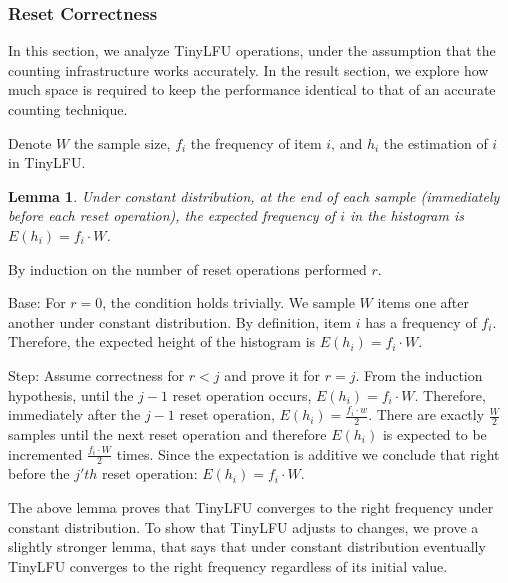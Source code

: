\documentclass[10pt,a4paper]{article}
\newtheorem{lemma}[theorem]{Lemma}
\newenvironment{proof}[1][IEEEproof]{\begin{trivlist}
\item[\hskip \labelsep {\bfseries #1}]}{\end{trivlist}}
\newenvironment{definition}[1][Definition]{\begin{trivlist}
\item[\hskip \labelsep {\bfseries #1}]}{\end{trivlist}}
\begin{document}
\subsubsection{Reset Correctness}
In this section, we analyze TinyLFU operations, under the assumption that the counting infrastructure works accurately. In the result section, we explore how much space is required to keep the performance identical to that of an accurate counting technique.

\begin{definition}
Denote $W$ the sample size, $f_i$ the frequency of item $i$, and $h_i$ the estimation of $i$ in TinyLFU.
\end{definition}
\begin{lemma}
Under constant distribution, at the end of each sample (immediately before each reset operation), the expected frequency of $i$ in the histogram is $E(h_i) =  f_i \cdot W$.
\end{lemma}
\begin{proof}
By induction on the number of reset operations performed $r$.

Base: For $r=0$, the condition holds trivially. We sample $W$ items one after another under constant distribution. By definition, item $i$ has a frequency of $f_i$. Therefore, the expected height of the histogram is $E(h_i)=f_i \cdot W$.

Step: Assume correctness for $r<j$ and prove it for $r=j$. From the induction hypothesis, until the $j-1$ reset operation occurs, $E(h_i) = f_i\cdot W$. Therefore,
immediately after the $j-1$ reset operation, $E(h_i) = \frac{f_i\cdot w}{2}$. There are exactly $\frac{W}{2}$ samples until the next reset operation and therefore $E(h_i)$
is expected to be incremented $\frac{f_i \cdot W}{2}$ times. Since the expectation is additive we conclude that right before the $j'th$ reset operation: $E(h_i) = f_i \cdot W$.
\end{proof}
The above lemma proves that TinyLFU converges to the right frequency under constant distribution.
To show that TinyLFU adjusts to changes, we prove a slightly stronger lemma, that says that under constant distribution eventually TinyLFU converges to the right frequency regardless of its initial value.
\end{document}
